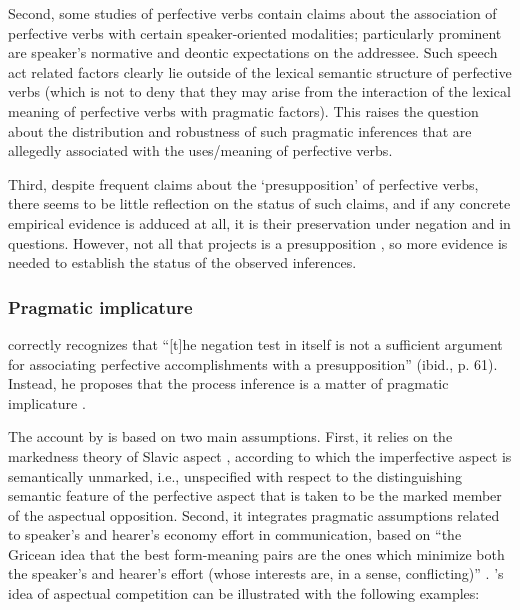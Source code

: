  Second, some studies of perfective verbs \citep[here represented by][]{Paducheva:96, Romanova:06} contain claims about the association of perfective verbs with certain speaker-oriented modalities; particularly prominent are speaker's normative and deontic expectations on the addressee. Such speech act related factors clearly lie outside of the lexical semantic structure of perfective verbs (which is not to deny that they may arise from the interaction of the lexical meaning of perfective verbs with pragmatic factors). This raises the question about the distribution and robustness of such pragmatic inferences that are allegedly associated with the uses/meaning of perfective verbs. 

 Third, despite frequent claims about the `presupposition' of perfective verbs, there seems to be little reflection on the status of such claims, and if any concrete empirical evidence is adduced at all, it is their preservation under negation and in questions. However, not all that projects is a presupposition \citep[see, e.g.,][]{ChierchiaMcConnell-Ginet:90, Beaver:01, Potts:05}, so more evidence is needed to establish the status of the observed inferences.

\subsubsection{Pragmatic implicature}
\citet{Gronn:04} correctly recognizes that ``[t]he negation test in itself is not a sufficient argument for associating perfective accomplishments with a presupposition'' (ibid., p. 61). Instead, he proposes that the process inference is a matter of pragmatic implicature \citep{Grice:75}.

The account by \citet{Gronn:04, Gronn:06} is based on two main assumptions. First, it relies on the markedness theory of Slavic aspect \citep{Maslov:58, Jakobson:71}, according to which the imperfective aspect is semantically unmarked, i.e., unspecified with respect to the distinguishing semantic feature of the perfective
aspect that is taken to be the marked member of the aspectual opposition.
Second, it integrates pragmatic assumptions related to speaker's and hearer's economy effort in communication, based on ``the Gricean idea that the best form-meaning pairs are the ones which minimize both the speaker's and hearer's effort (whose interests are, in a sense, conflicting)'' \citep[][71]{Gronn:06}. \citeauthor{Gronn:06}'s idea of aspectual competition can be illustrated with the following examples:

